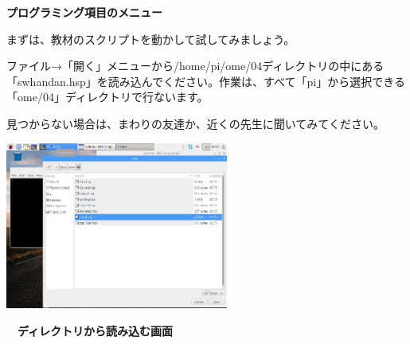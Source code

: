 \documentclass[a4paper,dvipdfmx]{jarticle}
\newcommand\textstyleqwerty[1]{#1}
\begin{document}
\bigskip


\bigskip


\bigskip


\bigskip


\bigskip


\bigskip


\bigskip


\bigskip


\bigskip

\textstyleqwerty{\textbf{プログラミング項目のメニュー}}


\bigskip


\bigskip


\bigskip


\bigskip

まずは、教材のスクリプトを動かして試してみましょう。

ファイル→「開く」メニューから/home/pi/ome/04ディレクトリの中にある「swhandan.hsp」を読み込んでください。作業は、すべて「pi」から選択できる「ome/04」ディレクトリで行ないます。

見つからない場合は、まわりの友達か、近くの先生に聞いてみてください。



\begin{center}
\includegraphics[width=7.338cm,height=5.493cm]{text04-img/text04-img002.png}

\end{center}

\bigskip


\bigskip


\bigskip


\bigskip


\bigskip


\bigskip


\bigskip


\bigskip


\bigskip


\bigskip

{\bfseries
　ディレクトリから読み込む画面}
\end{document}
